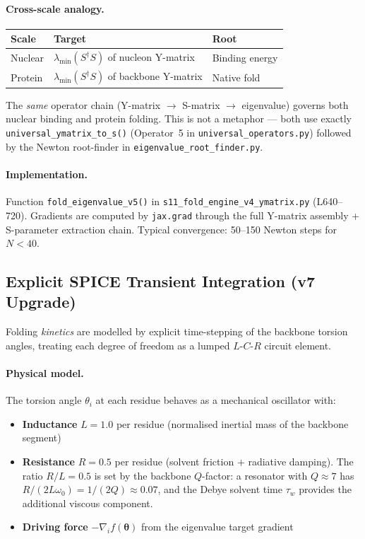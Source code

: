 \paragraph{Cross-scale analogy.}
\begin{center}
\small
\begin{tabular}{@{}l l l@{}}
\toprule
\textbf{Scale} & \textbf{Target} & \textbf{Root} \\
\midrule
Nuclear & $\lambda_{\min}(S^\dagger S)$ of nucleon Y-matrix & Binding energy \\
Protein & $\lambda_{\min}(S^\dagger S)$ of backbone Y-matrix & Native fold \\
\bottomrule
\end{tabular}
\end{center}
\noindent The \emph{same} operator chain (Y-matrix $\to$ S-matrix $\to$ eigenvalue) governs both nuclear binding and protein folding.  This is not a metaphor --- both use exactly \texttt{universal\_ymatrix\_to\_s()} (Operator~5 in \texttt{universal\_operators.py}) followed by the Newton root-finder in \texttt{eigenvalue\_root\_finder.py}.

\paragraph{Implementation.}
Function \texttt{fold\_eigenvalue\_v5()} in \texttt{s11\_fold\_engine\_v4\_ymatrix.py} (L640--720).  Gradients are computed by \texttt{jax.grad} through the full Y-matrix assembly + S-parameter extraction chain.  Typical convergence: 50--150 Newton steps for $N < 40$.


\subsection{Explicit SPICE Transient Integration (v7 Upgrade)}
\label{sec:spice_v7}

Folding \emph{kinetics} are modelled by explicit time-stepping of the backbone torsion angles, treating each degree of freedom as a lumped $L$-$C$-$R$ circuit element.

\paragraph{Physical model.}
The torsion angle $\theta_i$ at each residue behaves as a mechanical oscillator with:
\begin{itemize}
    \item \textbf{Inductance} $L = 1.0$ per residue (normalised inertial mass of the backbone segment)
    \item \textbf{Resistance} $R = 0.5$ per residue (solvent friction $+$ radiative damping).  The ratio $R/L = 0.5$ is set by the backbone $Q$-factor: a resonator with $Q \approx 7$ has $R/(2L\omega_0) = 1/(2Q) \approx 0.07$, and the Debye solvent time $\tau_w$ provides the additional viscous component.
    \item \textbf{Driving force} $-\nabla_i f(\boldsymbol{\theta})$ from the eigenvalue target gradient
\end{itemize}

